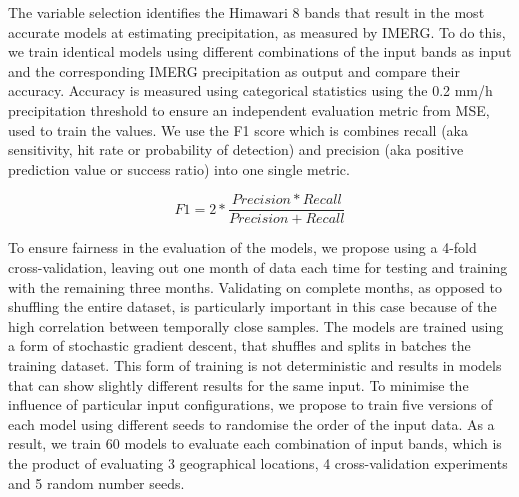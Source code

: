 \documentclass[3p,times]{elsarticle}
\begin{document}
The variable selection identifies the Himawari 8 bands that result in the most accurate models at estimating precipitation, as measured by IMERG. To do this, we train identical models using different combinations of the input bands as input and the corresponding IMERG precipitation as output and compare their accuracy. Accuracy is measured using categorical statistics using the 0.2 mm/h precipitation threshold to ensure an independent evaluation metric from MSE, used to train the values. We use the F1 score which is combines recall (aka sensitivity, hit rate or probability of detection) and precision (aka positive prediction value or success ratio) into one single metric.

$$
F1 = 2 * \frac{Precision * Recall}{Precision + Recall}
$$

To ensure fairness in the evaluation of the models, we propose using a 4-fold cross-validation, leaving out one month of data each time for testing and training with the remaining three months. Validating on complete months, as opposed to shuffling the entire dataset, is particularly important in this case because of the high correlation between temporally close samples. The models are trained using a form of stochastic gradient descent, that shuffles and splits in batches the training dataset. This form of training is not deterministic and results in models that can show slightly different results for the same input. To minimise the influence of particular input configurations, we propose to train five versions of each model using different seeds to randomise the order of the input data. As a result, we train 60 models to evaluate each combination of input bands, which is the product of evaluating 3 geographical locations, 4 cross-validation experiments and 5 random number seeds.
\end{document}
